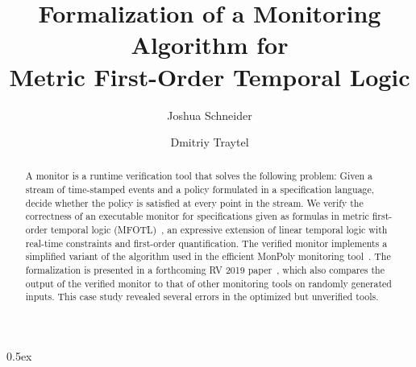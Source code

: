 \documentclass[10pt,a4paper]{article}
\begin{document}
\title{Formalization of a Monitoring Algorithm for\\ Metric First-Order Temporal Logic}
\author{Joshua Schneider \and Dmitriy Traytel}

\maketitle

\begin{abstract} A monitor is a runtime verification tool that solves the following
problem: Given a stream of time-stamped events and a policy formulated in a specification
language, decide whether the policy is satisfied at every point in the stream. We verify
the correctness of an executable monitor for specifications given as formulas in metric
first-order temporal logic (MFOTL)~\cite{BasinKMZ-JACM15}, an expressive extension of
linear temporal logic with real-time constraints and
first-order quantification. The verified monitor implements a simplified variant of the algorithm
used in the efficient MonPoly monitoring tool~\cite{monpoly}. The formalization is presented in a
forthcoming RV 2019 paper~\cite{SchneiderBKT-RV19}, which also compares the output of the
verified monitor to that of other monitoring tools on randomly generated inputs. This
case study revealed several errors in the optimized but unverified tools. \end{abstract}

\tableofcontents

\parindent 0pt\parskip 0.5ex





\end{document}
